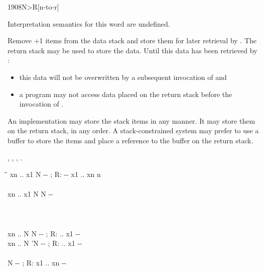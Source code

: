 \enlargethispage{8ex}\vspace*{-2.5ex}
\begin{worddef}[NtoR]{1908}{N>R}[n-to-r]%

\interpret
	Interpretation semantics for this word are undefined.

\execute {} 

	Remove +1 items from the data stack and store them for later
	retrieval by . The return stack may be used to store the
	data. Until this data has been retrieved by :
	\begin{itemize}
	\item this data will not be overwritten by a subsequent invocation of
		 and
	\item a program may not access data placed on the return stack before
		the invocation of .
	\end{itemize} 


	\begin{rationale}
		An implementation may store the stack items in any manner.  It may
		store them on the return stack, in any order.  A stack-constrained
		system may prefer to use a buffer to store the items and place a
		reference to the buffer on the return stack.

	\see {},
		  ,
		  , \linebreak
		  .
	\end{rationale}

	\begin{implement} %

		\begin{tabbing}
		\tab \= \tab \= \tab[11] \= \kill
		\word{:}             xn .. x1 N -{}- ; R: -{}- x1 .. xn n \\
		  \+ \\
			 \>\>  xn .. x1 N N -{}- \\
			 \+ \\
				 \- \\
			 \+ \\
				   \word{toR}  \> xn .. N N -{}- ; R: .. x1 -{}- \\
				 \>  xn .. N 'N -{}- ; R: .. x1 -{}- \- \\
		 \\
		 \>\>  N -{}- ; R: x1 .. xn -{}- \\
		  \word{toR}  \- \\
		\word{;}
		\end{tabbing}
	\end{implement}


\end{worddef}
